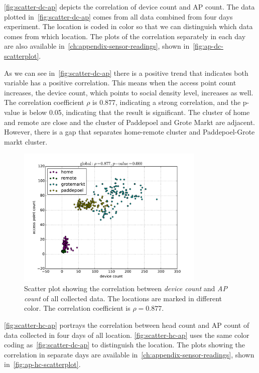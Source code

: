 	\autoref{fig:scatter-dc-ap} depicts the correlation of device count and \ac{AP} count. The data plotted in~\autoref{fig:scatter-dc-ap} comes from all data combined from four days experiment. The location is coded in color so that we can distinguish which data comes from which location. The plots of the correlation separately in each day are also available in~\autoref{ch:appendix-sensor-readings}, shown in~\autoref{fig:ap-dc-scatterplot}.
	
	As we can see in~\autoref{fig:scatter-dc-ap} there is a positive trend that indicates both variable has a positive correlation. This means when the access point count increases, the device count, which points to social density level, increases as well. The correlation coefficient $\rho$ is 0.877, indicating a strong correlation, and the p-value is below 0.05, indicating that the result is significant.
	The cluster of home and remote are close and the cluster of Paddepoel and Grote Markt are adjacent. However, there is a gap that separates home-remote cluster and Paddepoel-Grote markt cluster.

	\begin{figure}[h]
		\centering
		\includegraphics[width=0.8\textwidth]{./img/result/global-pr-vs-ap}
		\caption[Scatter plot showing the correlation of device count and \ac{AP} count.]
		{Scatter plot showing the correlation between \textit{device count} and \textit{\ac{AP} count} of all collected data. The locations are marked in different color. The correlation coefficient is $\rho=0.877$.}
		\label{fig:scatter-dc-ap}
	\end{figure}

	\autoref{fig:scatter-hc-ap} portrays the correlation between head count and \ac{AP} count of data collected in four days of all location. \autoref{fig:scatter-hc-ap} uses the same color coding as~\autoref{fig:scatter-dc-ap} to distinguish the location. The plots showing the correlation in separate days are available in~\autoref{ch:appendix-sensor-readings}, shown in~\autoref{fig:ap-hc-scatterplot}.
	
